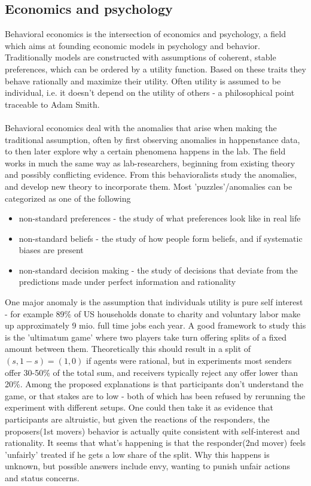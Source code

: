 \documentclass[12pt, a4paper]{article}
\begin{document}
\begin{multicols}{2}
\subsection{Economics and psychology}
Behavioral economics is the intersection of economics and psychology, a field which aims at founding economic models in psychology and behavior. Traditionally models are constructed with assumptions of coherent, stable preferences, which can be ordered by a utility function. Based on these traits they behave rationally and maximize their utility. Often utility is assumed to be individual, i.e. it doesn't depend on the utility of others - a philosophical point traceable to Adam Smith.
\\ \\
Behavioral economics deal with the anomalies that arise when making the traditional assumption, often by first observing anomalies in happenstance data, to then later explore why a certain phenomena happens in the lab. The field works in much the same way as lab-researchers, beginning from existing theory and possibly conflicting evidence. From this behavioralists study the anomalies, and develop new theory to incorporate them. Most 'puzzles'/anomalies can be categorized as one of the following
\begin{itemize}
\item non-standard preferences - the study of what preferences look like in real life
\item non-standard beliefs - the study of how people form beliefs, and if systematic biases are present
\item non-standard decision making - the study of decisions that deviate from the predictions made under perfect information and rationality
\end{itemize}
One major anomaly is the assumption that individuals utility is pure self interest - for example 89\% of US households donate to charity and voluntary labor make up approximately 9 mio. full time jobs each year. A good framework to study this is the 'ultimatum game' where two players take turn offering splits of a fixed amount between them. Theoretically this should result in a split of $(s,1-s)=(1,0)$ if agents were rational, but in experiments most senders offer 30-50\% of the total sum, and receivers typically reject any offer lower than 20\%. Among the proposed explanations is that participants don't understand the game, or that stakes are to low - both of which has been refused by rerunning the experiment with different setups. One could then take it as evidence that participants are altruistic, but given the reactions of the responders, the proposers(1st movers) behavior is actually quite consistent with self-interest and rationality. It seems that what's happening is that the responder(2nd mover) feels 'unfairly' treated if he gets a low share of the split. Why this happens is unknown, but possible answers include envy, wanting to punish unfair actions and status concerns. 

\end{multicols}
\end{document}
